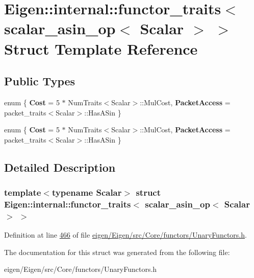 \hypertarget{struct_eigen_1_1internal_1_1functor__traits_3_01scalar__asin__op_3_01_scalar_01_4_01_4}{}\section{Eigen\+:\+:internal\+:\+:functor\+\_\+traits$<$ scalar\+\_\+asin\+\_\+op$<$ Scalar $>$ $>$ Struct Template Reference}
\label{struct_eigen_1_1internal_1_1functor__traits_3_01scalar__asin__op_3_01_scalar_01_4_01_4}
\subsection*{Public Types}
\begin{DoxyCompactItemize}
\item 
\mbox{\label{struct_eigen_1_1internal_1_1functor__traits_3_01scalar__asin__op_3_01_scalar_01_4_01_4_afd0be28ef40f89d70ed1df67dcca957d}} 
enum \{ {\bfseries Cost} = 5 $\ast$ Num\+Traits$<$Scalar$>$\+:\+:Mul\+Cost, 
{\bfseries Packet\+Access} = packet\+\_\+traits$<$Scalar$>$\+:\+:Has\+A\+Sin
 \}
\item 
\mbox{\label{struct_eigen_1_1internal_1_1functor__traits_3_01scalar__asin__op_3_01_scalar_01_4_01_4_ad2456377df98c8aa7eef5396f7ad0503}} 
enum \{ {\bfseries Cost} = 5 $\ast$ Num\+Traits$<$Scalar$>$\+:\+:Mul\+Cost, 
{\bfseries Packet\+Access} = packet\+\_\+traits$<$Scalar$>$\+:\+:Has\+A\+Sin
 \}
\end{DoxyCompactItemize}


\subsection{Detailed Description}
\subsubsection*{template$<$typename Scalar$>$\newline
struct Eigen\+::internal\+::functor\+\_\+traits$<$ scalar\+\_\+asin\+\_\+op$<$ Scalar $>$ $>$}



Definition at line \hyperlink{eigen_2_eigen_2src_2_core_2functors_2_unary_functors_8h_source_l00466}{466} of file \hyperlink{eigen_2_eigen_2src_2_core_2functors_2_unary_functors_8h_source}{eigen/\+Eigen/src/\+Core/functors/\+Unary\+Functors.\+h}.



The documentation for this struct was generated from the following file\+:\begin{DoxyCompactItemize}
\item 
eigen/\+Eigen/src/\+Core/functors/\+Unary\+Functors.\+h\end{DoxyCompactItemize}
